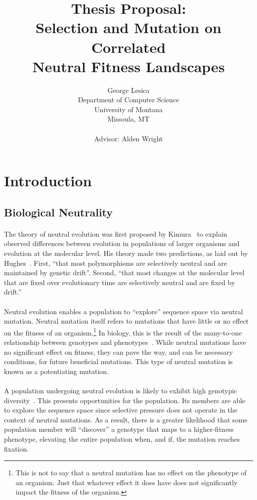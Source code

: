 \documentclass[12pt,letterpaper,titlepage]{article}
\title{Thesis Proposal:\\
Selection and Mutation on Correlated\\
Neutral Fitness Landscapes}
\author{George Lesica\\
Department of Computer Science\\
University of Montana\\
Missoula, MT\\
\\
Advisor: Alden Wright}
\begin{document}
\maketitle

\section{Introduction}

\subsection{Biological Neutrality}

\paragraph{}
The theory of neutral evolution was first proposed by Kimura~\cite{Kimura1984}
to explain observed differences between evolution in populations of larger
organisms and evolution at the molecular level. His theory made two
predictions, as laid out by Hughes~\cite{Hughes2007}. First, ``that most
polymorphisms are selectively neutral and are maintained by genetic drift''.
Second, ``that most changes at the molecular level that are fixed over
evolutionary time are selectively neutral and are fixed by drift.''

\paragraph{}
Neutral evolution enables a population to ``explore'' sequence space via
neutral mutation. Neutral mutation itself refers to mutations that have little
or no effect on the fitness of an organism.\footnote{This is not to say that a
neutral mutation has no effect on the phenotype of an organism. Just that
whatever effect it does have does not significantly impact the fitness of the
organism.} In biology, this is the result of the many-to-one relationship
between genotypes and phenotypes~\cite{Newman1998}. While neutral mutations
have no significant effect on fitness, they can pave the way, and can be
necessary conditions, for future beneficial mutations. This type of neutral
mutation is known as a potentiating mutation.

\paragraph{}
A population undergoing neutral evolution is likely to exhibit high genotypic
diversity~\cite{Huynen1996a}. This presents opportunities for the population.
Its members are able to explore the sequence space since selective pressure
does not operate in the context of neutral mutations. As a result, there is a
greater likelihood that some population member will ``discover'' a genotype
that maps to a higher-fitness phenotype, elevating the entire population when,
and if, the mutation reaches fixation.
\end{document}
